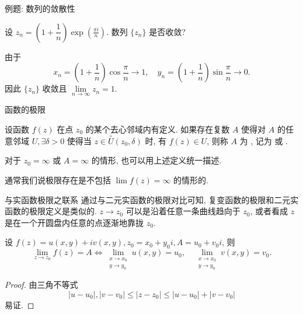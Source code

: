 \begin{frame}{例题: 数列的敛散性}
\begin{example}
设 $z_n=\left(1+\dfrac1n\right)\exp\left(\frac{\pi i}n\right)$. 数列 $\{z_n\}$ 是否收敛?
\end{example}
\begin{solution}
由于
\[x_n=\left(1+\frac1n\right)\cos\frac\pi n\to 1,\quad
y_n=\left(1+\frac1n\right)\sin\frac\pi n\to 0.\]
\onslide<+->
因此 $\{z_n\}$ 收敛且 $\lim\limits_{n\to\infty}z_n=1$.
\end{solution}
\end{frame}


\begin{frame}{函数的极限}
\begin{definition}
设函数 $f(z)$ 在点 $z_0$ 的某个去心邻域内有定义.
\onslide<+->
如果存在复数 $A$ 使得对 $A$ 的任意邻域 $U,\exists\delta>0$ 使得当 $z\in\stackrel\circ U(z_0,\delta)$ 时, 有 $f(z)\in U$, 则称 $A$ 为 , 记为  或 .
\end{definition}

\onslide<+->
对于 $z_0=\infty$ 或 $A=\infty$ 的情形, 也可以用上述定义统一描述.

\onslide<+->
通常我们说极限存在是不包括 $\lim f(z)=\infty$ 的情形的.
\end{frame}


\begin{frame}{与实函数极限之联系}
\onslide<+->
通过与二元实函数的极限对比可知, 复变函数的极限和二元实函数的极限定义是类似的.
\onslide<+->
$z\to z_0$ 可以是沿着任意一条曲线趋向于 $z_0$, 或者看成 $z$ 是在一个开圆盘内任意的点逐渐地靠拢 $z_0$.

\begin{theorem}
设 $f(z)=u(x,y)+iv(x,y),z_0=x_0+y_0i,A=u_0+v_0i$, 则
\[\lim_{z\to z_0}f(z)=A\iff
\lim_{\substack{x\to x_0\\y\to y_0}}u(x,y)=u_0,\quad
\lim_{\substack{x\to x_0\\y\to y_0}}v(x,y)=v_0.\]
\vspace{-0.5\baselineskip}
\end{theorem}

\begin{proof}
由三角不等式
\[|u-u_0|,|v-v_0|\le|z-z_0|\le|u-u_0|+|v-v_0|\]
\vspace{-3pt}
易证.
\end{proof}
\end{frame}



